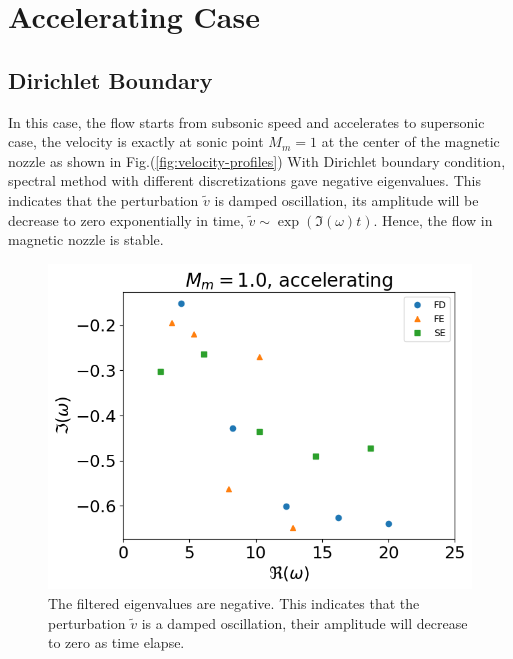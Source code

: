\section{Accelerating Case}
\subsection{Dirichlet Boundary}
In this case, the flow starts from subsonic speed and accelerates to supersonic case, the velocity is exactly at sonic point $M_m=1$ at the center of the magnetic nozzle as shown in Fig.(\ref{fig:velocity-profiles})
With Dirichlet boundary condition, spectral method with different discretizations gave negative eigenvalues. This indicates that the perturbation $\tilde{v}$ is damped oscillation, its amplitude will be decrease to zero exponentially in time, $\tilde{v} \sim \exp(\Im(\omega)t)$. Hence, the flow in magnetic nozzle is stable.
\begin{figure} [H]
	\centering
	\includegraphics[width=0.7\linewidth]{img/numerical-experiments/fixed-fixed/accelerating-v}
	\caption{The filtered eigenvalues are negative. This indicates that the perturbation $\tilde{v}$ is a damped oscillation, their amplitude will decrease to zero as time elapse.}
	\label{fig:accelerating-v-dirichlet}
\end{figure}

